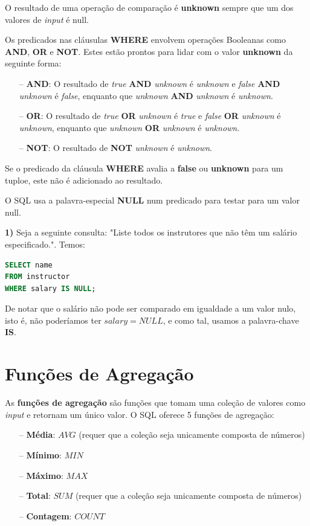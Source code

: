 \documentclass[oneside]{book}
\theoremstyle{definition}
\begin{document}
O resultado de uma operação de comparação é \textbf{unknown} sempre que um dos valores de \textit{input} é null.

Os predicados nas cláusulas \textbf{WHERE} envolvem operações Booleanas como \textbf{AND}, \textbf{OR} e \textbf{NOT}. Estes estão prontos para lidar com o valor \textbf{unknown} da seguinte forma:
\begin{itemize}
    \itemsep0cm
    \item[--]\textbf{AND}: O resultado de \textit{true} \textbf{AND} \textit{unknown} é \textit{unknown} e \textit{false} \textbf{AND} \textit{unknown} é \textit{false}, enquanto que \textit{unknown} \textbf{AND} \textit{unknown} é \textit{unknown}.
    \item[--]\textbf{OR}: O resultado de \textit{true} \textbf{OR} \textit{unknown} é \textit{true} e \textit{false} \textbf{OR} \textit{unknown} é \textit{unknown}, enquanto que \textit{unknown} \textbf{OR} \textit{unknown} é \textit{unknown}.
    \item[--]\textbf{NOT}: O resultado de \textbf{NOT} \textit{unknown} é \textit{unknown}.
\end{itemize}

Se o predicado da cláusula \textbf{WHERE} avalia a \textbf{false} ou \textbf{unknown} para um tuploe, este não é adicionado ao resultado.

O SQL usa a palavra-especial \textbf{NULL} num predicado para testar para um valor null.

\textbf{1)} Seja a seguinte consulta: "Liste todos os instrutores que não têm um salário especificado.". Temos:
\begin{lstlisting}[language=SQL, morekeywords={REFERENCES, REFRESH, MATERIALIZED, CONCURRENTLY}, framesep=8pt, xleftmargin=40pt, framexleftmargin=40pt, frame=tb, framerule=0pt]
SELECT name
FROM instructor
WHERE salary IS NULL;
\end{lstlisting}

De notar que o salário não pode ser comparado em igualdade a um valor nulo, isto é, não poderíamos ter $salary = NULL$, e como tal, usamos a palavra-chave \textbf{IS}.

\section{Funções de Agregação}
As \textbf{funções de agregação} são funções que tomam uma coleção de valores como \textit{input} e retornam um único valor. O SQL oferece 5 funções de agregação:
\begin{itemize}
    \itemsep0cm
    \item[--]\textbf{Média}: $AVG$ (requer que a coleção seja unicamente composta de números)
    \item[--]\textbf{Mínimo}: $MIN$
    \item[--]\textbf{Máximo}: $MAX$
    \item[--]\textbf{Total}: $SUM$ (requer que a coleção seja unicamente composta de números)
    \item[--]\textbf{Contagem}: $COUNT$
\end{itemize}
\end{document}

